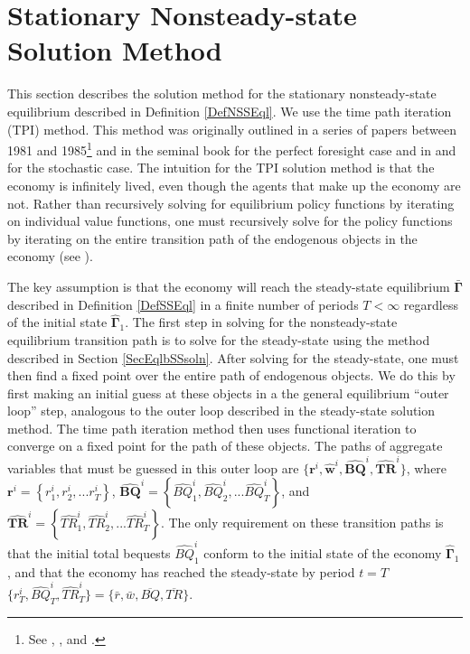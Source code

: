 \section{Stationary Nonsteady-state Solution Method}\label{SecEqlbNSSsoln}

  \renewcommand\theenumi{\arabic{enumi}}
  \renewcommand\theenumii{\alph{enumii}}
  \renewcommand\theenumiii{\roman{enumiii}}

  This section describes the solution method for the stationary nonsteady-state equilibrium described in Definition \ref{DefNSSEql}. We use the time path iteration (TPI) method. This method was originally outlined in a series of papers between 1981 and 1985\footnote{See \citet{AuerbachEtAl:1981,AuerbachEtAl:1983}, \citet{AuerbachKotlikoff:1983a,AuerbachKotlikoff:1983b,AuerbachKotlikoff:1983c}, and \citet{AuerbachKotlikoff:1985}.} and in the seminal book \citet[ch. 4]{AuerbachKotlikoff:1987} for the perfect foresight case and in \citet[Appendix II]{NishiyamaSmetters:2007} and \citet[Sec. 3.1]{EvansPhillips:2014} for the stochastic case. The intuition for the TPI solution method is that the economy is infinitely lived, even though the agents that make up the economy are not. Rather than recursively solving for equilibrium policy functions by iterating on individual value functions, one must recursively solve for the policy functions by iterating on the entire transition path of the endogenous objects in the economy (see \citet[ch. 17]{StokeyLucas1989}).

  The key assumption is that the economy will reach the steady-state equilibrium $\bm{\bar{\Gamma}}$ described in Definition \ref{DefSSEql} in a finite number of periods $T<\infty$ regardless of the initial state $\bm{\hat{\Gamma}}_1$. The first step in solving for the nonsteady-state equilibrium transition path is to solve for the steady-state using the method described in Section \ref{SecEqlbSSsoln}. After solving for the steady-state, one must then find a fixed point over the entire path of endogenous objects.  We do this by first making an initial guess at these objects in a the general equilibrium ``outer loop'' step, analogous to the outer loop described in the steady-state solution method. The time path iteration method then uses functional iteration to converge on a fixed point for the path of these objects.  The paths of aggregate variables that must be guessed in this outer loop are $\{\bm{r}^i,\bm{\hat{w}}^i,\bm{\hat{BQ}}^i, \bm{\hat{TR}}^i\}$, where $\bm{r}^i = \left\{r_1^i,r_2^i,...r_T^i\right\}$, $\bm{\hat{BQ}}^i = \left\{\hat{BQ}_1^i,\hat{BQ}_2^i,...\hat{BQ}_T^i\right\}$, and $\bm{\hat{TR}}^i = \left\{\hat{TR}_1^i,\hat{TR}_2^i,...\hat{TR}_T^i\right\}$. The only requirement on these transition paths is that the initial total bequests $\hat{BQ}_1^i$ conform to the initial state of the economy $\bm{\hat{\Gamma}}_1$, and that the economy has reached the steady-state by period $t=T$ $\{r_T^i, \hat{BQ}_T^i, \hat{TR}_T^i\} = \{\bar{r}, \bar{w}, \overline{BQ}, \overline{TR}\}$.

